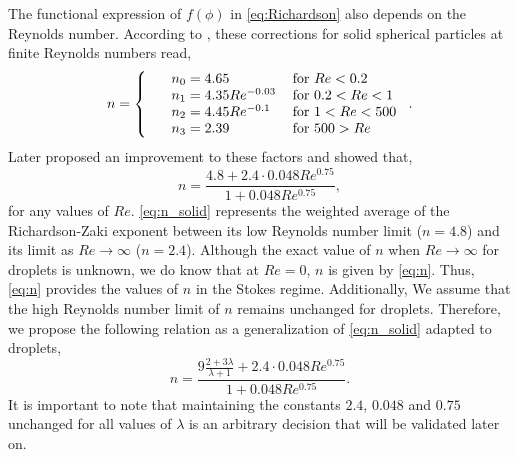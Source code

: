 The functional expression of $f(\phi)$ in \ref{eq:Richardson} also depends on the Reynolds number. 
According to \citet{richardson1997sedimentation}, these corrections for solid spherical particles at finite Reynolds numbers read, 
\begin{equation}
    n = \left\{
        \begin{tabular}{lll}
            &$n_0 =4.65$ & for $Re<0.2$\\ 
            &$n_1 = 4.35 Re^{-0.03}$ & for $0.2<Re<1$\\ 
            &$n_2 = 4.45 Re^{-0.1}$ & for $1<Re<500$\\ 
            &$n_3 = 2.39$ & for $500>Re$\\ 
        \end{tabular}
    \right. . 
    \label{eq:n_jackson}
\end{equation}
Later \citet{kramer2019improvement} proposed an improvement to these factors and showed that, 
\begin{equation}
    n = \frac{4.8 + 2.4 \cdot 0.048 Re^{0.75}}{1+0.048 Re^{0.75}},
    \label{eq:n_solid}
\end{equation} 
for any values of $Re$. 
\ref{eq:n_solid} represents the weighted average of the Richardson-Zaki exponent between its low Reynolds number limit ($n=4.8$) and its limit as $Re \to \infty$ ($n = 2.4$).  
Although the exact value of $n$ when $Re\to\infty$ for droplets is unknown, we do know that at $Re = 0$, $n$ is given by \ref{eq:n}. 
Thus, \ref{eq:n} provides the values of $n$ in the Stokes regime.
Additionally, We assume that the high Reynolds number limit of $n$ remains unchanged for droplets. 
Therefore, we propose the following relation as a generalization of \ref{eq:n_solid} adapted to droplets, 
\begin{equation}
    n = \frac{9 \frac{2+3\lambda}{\lambda+1} + 2.4 \cdot 0.048 Re^{0.75}}{1+0.048 Re^{0.75}}. 
    \label{eq:final_n}
\end{equation} 
It is important to note that maintaining the constants $2.4$, $0.048$ and $0.75$ unchanged for all values of  $\lambda$ is an arbitrary decision that will be validated later on. 


